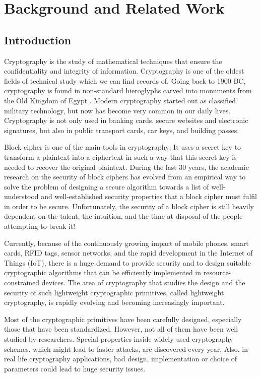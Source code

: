 \part{Background and Related Work} \label{part:Background}
\chapter{Introduction}
\label{chapterlabel1}
Cryptography is the study of mathematical techniques that ensure the confidentiality and integrity of information. Cryptography is one of the oldest fields of technical study which we can find records of. Going back to 1900 BC,  cryptography is found in non-standard hieroglyphs carved into monuments from the Old Kingdom of Egypt \cite{kahn1996codebreakers}. Modern cryptography started out as classified military technology, but now has become very common in our daily lives. Cryptography is not only used in banking cards, secure websites and electronic signatures, but also in public transport cards, car keys, and building passes. 

Block cipher is one of the main tools in cryptography; It uses a secret key to transform a plaintext into a ciphertext in such a way that this secret key is needed to recover the original plaintext. During the last 30 years, the academic research on the security of block ciphers has evolved from an empirical way to solve the problem of designing a secure algorithm towards a list of well-understood and well-established  security properties that a block cipher must fulfil in order to be secure. Unfortunately, the  security of a block cipher is still heavily dependent on the talent, the intuition, and the time at disposal of the people attempting to break it!

Currently, because of the continuously growing impact of mobile phones, smart cards, RFID tags, sensor networks, and the rapid development in the Internet of Things (IoT), there is a huge demand to provide security and to design suitable cryptographic algorithms that can be efficiently implemented in resource-constrained devices. The area of cryptography that studies the design and the security of such lightweight cryptographic primitives, called lightweight cryptography, is rapidly evolving and becoming increasingly important. 

Most of the cryptographic primitives have been carefully designed, especially those that have been standardized. However, not all of them have been well studied by researchers. Special properties  inside widely used cryptography schemes, which might lead to faster attacks, are discovered every year. Also, in real life cryptography applications, bad design, implementation or choice of parameters could lead to huge security issues.

